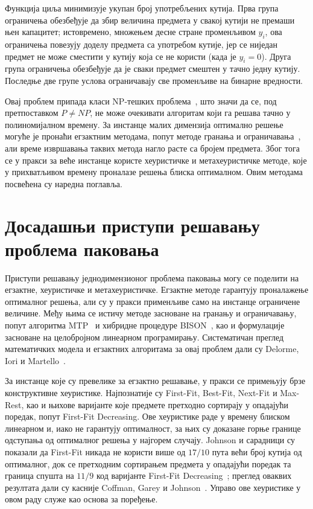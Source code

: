 Функција циља минимизује укупан број употребљених кутија. Прва група ограничења
обезбеђује да збир величина предмета у свакој кутији не премаши њен капацитет;
истовремено, множењем десне стране променљивом $y_i$, ова ограничења повезују доделу
предмета са употребом кутије, јер се ниједан предмет не може сместити у кутију која се не
користи (када је $y_i = 0$). Друга група ограничења обезбеђује да је сваки предмет
смештен у тачно једну кутију. Последње две групе услова ограничавају све променљиве на
бинарне вредности.

Овај проблем припада класи NP-тешких проблема~\cite{gareyjohnson1979}, што значи да се,
под претпоставком $P \neq NP$, не може очекивати алгоритам који га решава тачно у
полиномијалном времену. За инстанце малих димензија оптимално решење могуће је пронаћи
егзактним методама, попут методе гранања и ограничавања~\cite{martello1990}, али време
извршавања таквих метода нагло расте са бројем предмета. Због тога се у пракси за веће
инстанце користе хеуристичке и метахеуристичке методе, које у прихватљивом времену
проналазе решења блиска оптималном. Овим методама посвећена су наредна поглавља.

\section{Досадашњи приступи решавању проблема паковања}

Приступи решавању једнодимензионог проблема паковања могу се поделити на егзактне,
хеуристичке и метахеуристичке. Егзактне методе гарантују проналажење оптималног решења,
али су у пракси применљиве само на инстанце ограничене величине. Међу њима се истичу
методе засноване на гранању и ограничавању, попут алгоритма MTP~\cite{martello1990} и
хибридне процедуре BISON~\cite{scholl1997}, као и формулације засноване на целобројном
линеарном програмирању. Систематичан преглед математичких модела и егзактних алгоритама
за овај проблем дали су Delorme, Iori и Martello~\cite{delorme2016}.

За инстанце које су превелике за егзактно решавање, у пракси се примењују брзе
конструктивне хеуристике. Најпознатије су First-Fit, Best-Fit, Next-Fit и Max-Rest, као
и њихове варијанте које предмете претходно сортирају у опадајући поредак, попут
First-Fit Decreasing. Ове хеуристике раде у времену блиском линеарном и, иако не
гарантују оптималност, за њих су доказане горње границе одступања од оптималног решења у
најгорем случају. Johnson и сарадници су показали да First-Fit никада не користи више од
$17/10$ пута већи број кутија од оптималног, док се претходним сортирањем предмета у
опадајући поредак та граница спушта на $11/9$ код варијанте First-Fit
Decreasing~\cite{johnson1974}; преглед оваквих резултата дали су касније Coffman, Garey и
Johnson~\cite{coffman1984}. Управо ове хеуристике у овом раду служе као основа за
поређење.

